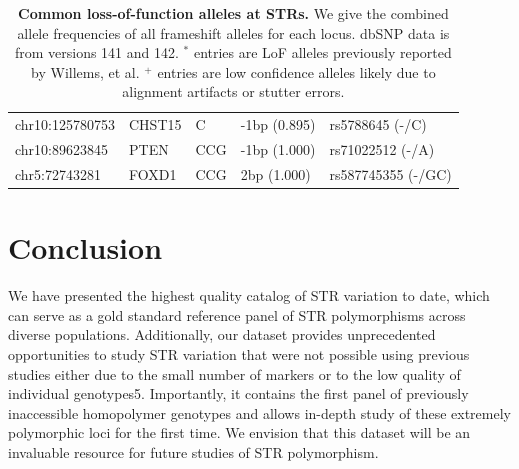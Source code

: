 \begin{table}[h!]
\begin{adjustbox}{width=1\textwidth}
\begin{tabular}{l l l l l}
chr10:125780753 & CHST15   & C      & -1bp (0.895)                  & rs5788645 (-/C)                        \\
chr10:89623845  & PTEN     & CCG    & -1bp (1.000)                  & rs71022512 (-/A)                       \\
chr5:72743281   & FOXD1    & CCG    & 2bp (1.000)                   & rs587745355 (-/GC)                    \\
\hline
\end{tabular}
\end{adjustbox}
\caption{\textbf{Common loss-of-function alleles at STRs.} We give the combined allele frequencies of all frameshift alleles for each locus. dbSNP data is from versions 141 and 142. $^*$ entries are LoF alleles previously reported by Willems, et al. $^+$ entries are low confidence alleles likely due to alignment artifacts or stutter errors.}
\end{table}

\section{Conclusion}
We have presented the highest quality catalog of STR variation to date, which can serve as a gold standard reference panel of STR polymorphisms across diverse populations. Additionally, our dataset provides unprecedented opportunities to study STR variation that were not possible using previous studies either due to the small number of markers or to the low quality of individual genotypes5. Importantly, it contains the first panel of previously inaccessible homopolymer genotypes and allows in-depth study of these extremely polymorphic loci for the first time. We envision that this dataset will be an invaluable resource for future studies of STR polymorphism.
